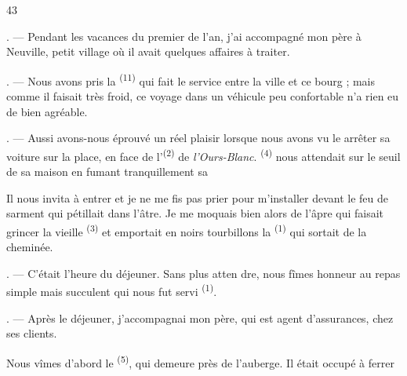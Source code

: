\begin{VUpage}[45]{43}
\VUsaut{4.0mm}
\VUsaut{3.0mm}
\VUfilet{16mm}
\VUsaut{5.6mm}
\VUsaut{3.0mm}

\VUsaut{3.0mm}

\VUsaut{4.0mm}

. --- Pendant les vacances du premier de l'an, j'ai\nl
accompagné mon père à Neuville, petit village où il\nl
avait quelques affaires à traiter.

. --- Nous avons pris la \textsuperscript{(11)} qui fait le\nl
service entre la ville et ce bourg ; mais comme il\nl
faisait très froid, ce voyage dans un véhicule peu\nl
confortable n'a rien eu de bien agréable.

. --- Aussi avons-nous éprouvé un réel plaisir\nl
lorsque nous avons vu le  arrêter sa\nl
voiture sur la place, en face de l'\textsuperscript{(2)} de\nl
\textit{l'Ours-Blanc}. \textsuperscript{(4)} nous attendait sur le\nl
seuil de sa maison en fumant tranquillement sa 

\VUblancAlinea
Il nous invita à entrer et je ne me fis pas prier\nl
pour m'installer devant le feu de sarment qui pétillait\nl
dans l'âtre. Je me moquais bien alors de l'âpre \nl
{} qui faisait grincer la vieille \textsuperscript{(3)} et\nl
emportait en noirs tourbillons la \textsuperscript{(1)} qui sortait\nl
de la cheminée.

. --- C'était l'heure du déjeuner. Sans plus atten\cc
dre, nous fîmes honneur au repas simple mais succulent\nl
qui nous fut servi \textsuperscript{(1)}.

. --- Après le déjeuner, j'accompagnai mon père,\nl
qui est agent d'assurances, chez ses clients.

\VUblancAlinea
Nous vîmes d'abord le \textsuperscript{(5)}, qui\nl
demeure près de l'auberge. Il était occupé à ferrer
\parplein
\end{VUpage}

